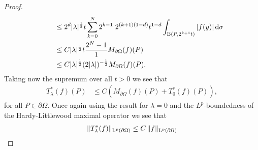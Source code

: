 \begin{proof}
\begin{align*}
     &\qquad\leq 2^d  |\lambda|^{\frac{1}{2}} t \sum_{k = 0}^N 2^{k - 1}\; 2^{(k + 1)(1 - d)} t^{1 - d} \int_{\mathrm{B}(P, 2^{k + 1}t)} |f(y)| \, {\operatorname{d}\!{\sigma}} \\
     &\qquad \leq C  |\lambda|^{\frac{1}{2}} t\frac{2^{N} - 1}{1} M_{\partial\Omega}(f)(P) \\
     &\qquad \leq C |\lambda|^{\frac{1}{2}} (2|\lambda|)^{-\frac{1}{2}} M_{\partial\Omega}(f)(P).
   \end{align*}
   Taking now the supremum over all $t > 0$ we see that
   \begin{align*}
     T_\lambda^*(f)(P)
     &\leq C (M_{\partial\Omega}(f)(P) + T_0^*(f)(P)),
   \end{align*}
   for all $P \in \partial\Omega$. Once again using the result for $\lambda = 0$ and the $L^p$-boundedness of the Hardy-Littlewood maximal operator we see that
   \begin{align*}
     \|T_\lambda^*(f) \|_{\mathrm{L}^p(\partial\Omega)} \leq C\, \|f\|_{\mathrm{L}^p(\partial\Omega)}
   \end{align*}


\end{proof}

